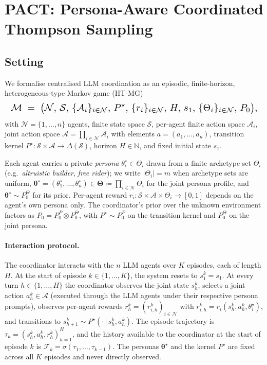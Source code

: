 \documentclass{article}
\begin{document}
\section{PACT: Persona-Aware Coordinated Thompson Sampling}
\label{sec:algorithm}

\subsection{Setting}
\label{sec:setting-main}

We formalise centralised LLM coordination as an episodic, finite-horizon, heterogeneous-type Markov game (HT-MG)
\begin{equation*}
\resizebox{\linewidth}{!}{$\displaystyle
\mathcal M \;=\; \big(\mathcal N,\,\mathcal S,\,\{\mathcal A_i\}_{i\in\mathcal N},\,P^\star,\,\{r_i\}_{i\in\mathcal N},\,H,\,s_1,\,\{\Theta_i\}_{i\in\mathcal N},\,P_0\big),
$}
\end{equation*}
with $\mathcal N=\{1,\dots,n\}$ agents, finite state space $\mathcal S$, per-agent finite action space $\mathcal A_i$, joint action space $\mathcal A\!=\!\prod_{i\in\mathcal N}\mathcal A_i$ with elements $a=(a_1,\dots,a_n)$, transition kernel $P^\star\!:\mathcal S\!\times\!\mathcal A\!\to\!\Delta(\mathcal S)$, horizon $H\in\mathbb N$, and fixed initial state $s_1$.

Each agent carries a private \emph{persona} $\theta_i^\star\in\Theta_i$ drawn from a finite archetype set $\Theta_i$ (e.g.\ \emph{altruistic builder}, \emph{free rider}); we write $|\Theta_i|=m$ when archetype sets are uniform, $\boldsymbol\theta^\star=(\theta_1^\star,\dots,\theta_n^\star)\in\boldsymbol\Theta\!\coloneqq\!\prod_{i\in\mathcal N}\Theta_i$ for the joint persona profile, and $\boldsymbol\theta^\star\!\sim\!P_0^\Theta$ for its prior. Per-agent reward $r_i\!:\mathcal S\!\times\!\mathcal A\!\times\!\Theta_i\!\to\![0,1]$ depends on the agent's own persona only. The coordinator's prior over the unknown environment factors as $P_0=P_0^P\!\otimes\!P_0^\Theta$, with $P^\star\!\sim\!P_0^P$ on the transition kernel and $P_0^\Theta$ on the joint persona.

\paragraph{Interaction protocol.} The coordinator interacts with the $n$ LLM agents over $K$ episodes, each of length $H$. At the start of episode $k\in\{1,\dots,K\}$, the system resets to $s_1^k\!=\!s_1$. At every turn $h\in\{1,\dots,H\}$ the coordinator observes the joint state $s_h^k$, selects a joint action $a_h^k\!\in\!\mathcal A$ (executed through the LLM agents under their respective persona prompts), observes per-agent rewards $r_h^k=(r_{i,h}^k)_{i\in\mathcal N}$ with $r_{i,h}^k=r_i(s_h^k,a_h^k,\theta_i^\star)$, and transitions to $s_{h+1}^k\!\sim\!P^\star(\cdot\,|\,s_h^k,a_h^k)$. The episode trajectory is $\tau_k\!=\!(s_h^k,a_h^k,r_h^k)_{h=1}^H$, and the history available to the coordinator at the start of episode $k$ is $\mathcal F_k\!=\!\sigma(\tau_1,\dots,\tau_{k-1})$. The personas $\boldsymbol\theta^\star$ and the kernel $P^\star$ are fixed across all $K$ episodes and never directly observed.
\end{document}
